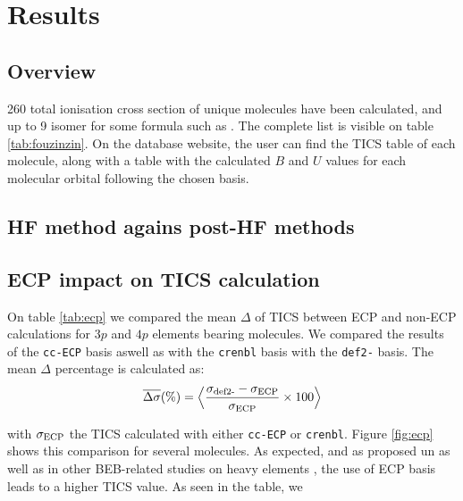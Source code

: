 \documentclass[twocolumn, a4paper, twoside,10pt]{scrartcl}
\begin{document}
\section{Results}
\subsection{Overview}
260 total ionisation cross section of unique molecules have been calculated, and up to 9 isomer for some formula such as . The complete list is visible on table \ref{tab:fouzinzin}. On the database website, the user can find the TICS table of each molecule, along with a table with the calculated $B$ and $U$ values for each molecular orbital following the chosen basis. 

\subsection{HF method agains post-HF methods}

\subsection{ECP impact on TICS calculation}\label{sec:ecp}
On table \ref{tab:ecp} we compared the mean $\Delta$ of TICS between ECP and non-ECP calculations for $3p$ and $4p$ elements bearing molecules.  We compared the results of the \verb|cc-ECP| basis aswell as with the \verb|crenbl| basis with the \verb|def2-| basis. The mean $\Delta$ percentage is calculated as:
\begin{align}
   \overline{\Delta\sigma} (\%)= \Bigl \langle \frac{\sigma_{\textrm{def2-}} - \sigma_{\textnormal{ECP}}}{\sigma_{\textnormal{ECP}}} \times 100 \Bigr \rangle
\end{align}

with $\sigma_{\textnormal{ECP}}$ the TICS calculated with either \verb|cc-ECP| or \verb|crenbl|.  Figure \ref{fig:ecp} shows this comparison for several molecules. 
As expected, and as proposed un \citet{huoUseRelativisticEffective2000} as well as in other BEB-related studies on heavy elements \citep{gravesEfficientCalculationElectron2021,dolgRelativisticPseudopotentialsTheir2012,scottElectronImpactIonizationCross2005}, the use of ECP basis leads to a higher TICS value. As seen in the table, we 
\end{document}
